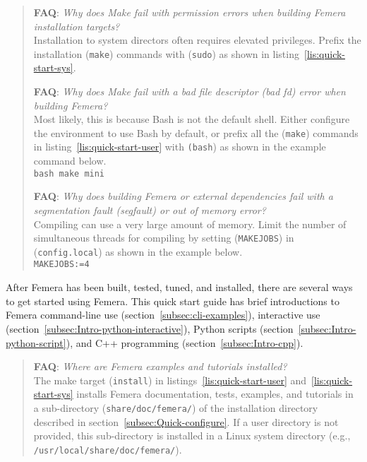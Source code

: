 \begin{verse}
\textbf{FAQ}:
\textit{Why does Make fail with permission errors when
building Femera installation targets?}\\
Installation to system directors often requires elevated
privileges. Prefix the installation (\texttt{make}) commands with (\texttt{sudo})
as shown in listing~\ref{lis:quick-start-sys}.

\textbf{FAQ}:
\textit{Why does Make fail with a bad file descriptor
(bad fd) error when building Femera?}\\
Most likely, this is because Bash is not the default
shell. Either configure the environment to use Bash by default, or
prefix all the (\texttt{make}) commands in listing~\ref{lis:quick-start-user}
with \texttt{(bash}) as shown in the example command below.\\
\texttt{bash make mini}

\textbf{FAQ}:
\textit{Why does building Femera or external dependencies fail
with a segmentation fault (segfault) or out of memory error?}\\
Compiling can use a very large amount of memory. Limit the number of
simultaneous threads for compiling by setting
(\texttt{MAKEJOBS}) in (\texttt{config.local})
as shown in the example below.\\
\texttt{MAKEJOBS:=4}

\end{verse}
After Femera has been built, tested, tuned, and installed,
there are several ways to get started using Femera.
This quick start guide has brief introductions to
Femera command-line use (section~\ref{subsec:cli-examples}),
interactive use (section~\ref{subsec:Intro-python-interactive}),
Python scripts (section~\ref{subsec:Intro-python-script}), and
C++ programming (section~\ref{subsec:Intro-cpp}).

\begin{verse}
\textbf{FAQ}:
\textit{Where are Femera examples and tutorials
installed?}\\
The make target (\texttt{install}) in listings~\ref{lis:quick-start-user}
and~\ref{lis:quick-start-sys} installs Femera documentation, tests, examples,
and tutorials in a sub-directory (\texttt{share/doc/femera/}) of the
installation directory described in section~\ref{subsec:Quick-configure}.
If a user directory is not provided, this sub-directory is installed
in a Linux system directory (e.g., \texttt{/usr/local/share/doc/femera/}).
\end{verse}
\begin{comment}
tdd:tests/post-install/docs-are-in-share-doc-femera-dir.sh
tdd:tests/post-install/tests-are-in-share-doc-femera-test-dir.sh
tdd:tests/post-install/examples-are-in-share-doc-femera-examples-dir.sh
tdd:tests/post-install/tutorial-is-in-share-doc-femera-tutorial-dir.sh
\end{comment}

